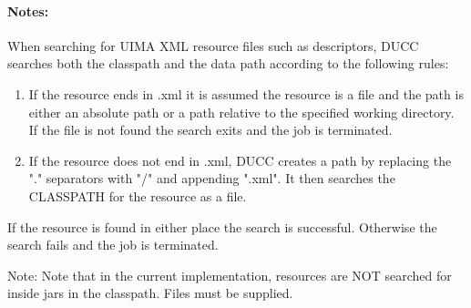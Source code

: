     \paragraph{Notes:}
    When searching for UIMA XML resource files such as descriptors, DUCC searches both the 
    classpath and the data path according to the following rules: 

    \begin{enumerate}
        \item If the resource ends in .xml it is assumed the resource is a file and the path is either
          an absolute path or a path relative to the specified working directory. If the file is not
          found the search exits and the job is terminated.

        \item If the resource does not end in .xml, DUCC creates a path by replacing the "." 
          separators with "/" and appending ".xml". It then searches the CLASSPATH for the 
          resource as a file. 
    \end{enumerate}

    If the resource is found in either place the search is successful. Otherwise the search 
    fails and the job is terminated. 

    Note: Note that in the current implementation, resources are NOT searched    
    for inside jars in the classpath. Files must be supplied. 

